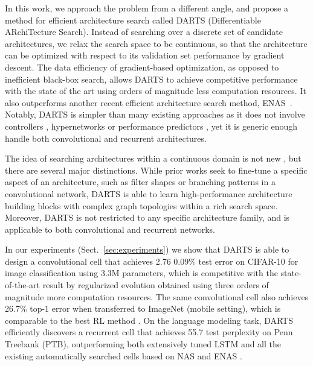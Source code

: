 \documentclass{article}
\begin{document}
In this work, we approach the problem from a different angle, and propose a method for efficient architecture search called DARTS (Differentiable ARchiTecture Search). Instead of searching over a discrete set of candidate architectures, we relax the search space to be continuous, so that the architecture can be optimized with respect to its validation set performance by gradient descent.
The data efficiency of gradient-based optimization, as opposed to inefficient black-box search,
allows DARTS to achieve competitive performance with the state of the art using orders of magnitude less computation resources. It also outperforms another recent efficient architecture search method, ENAS~\citep{pham2018efficient}.
Notably,
DARTS is simpler than many existing approaches as it does not involve 
controllers \citep{zoph2016neural, baker2016designing, zoph2017learning, pham2018efficient, zhong2018practical}, hypernetworks \citep{brock2017smash} or performance predictors \citep{liu2017progressive},
yet it is generic enough handle both convolutional and recurrent architectures.

The idea of searching architectures within a continuous domain is not new \citep{saxena2016convolutional, ahmed2017connectivity, veniat2017learning, shin2018differentiable},
but there are several major distinctions.
While prior works seek to fine-tune a specific aspect of an architecture,
such as filter shapes or branching patterns in a convolutional network,
DARTS is able to learn high-performance architecture building blocks with complex graph topologies within a rich search space.
Moreover,
DARTS is not restricted to any specific architecture family,
and is applicable to both convolutional and recurrent networks.

In our experiments (Sect.~\ref{sec:experiments})
we show that DARTS is able to design a convolutional cell that achieves 2.76  0.09\% test error on CIFAR-10 for image classification using 3.3M parameters,
which is competitive with the state-of-the-art result by regularized evolution \citep{real2018regularized} obtained using three orders of magnitude more computation resources.
The same convolutional cell also achieves 26.7\% top-1 error when transferred to ImageNet (mobile setting),
which is comparable to the best RL method \citep{zoph2017learning}.
On the language modeling task,
DARTS efficiently discovers a recurrent cell that achieves 55.7 test perplexity on Penn Treebank (PTB),
outperforming both extensively tuned LSTM \citep{melis2017state}
and all the existing automatically searched cells based on NAS \citep{zoph2016neural} and ENAS \citep{pham2018efficient}.
\end{document}
